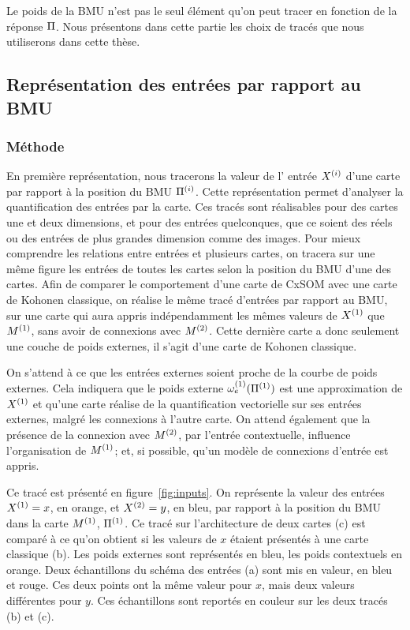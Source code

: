 Le poids de la BMU n'est pas le seul élément qu'on peut tracer en fonction de la réponse $\Pi$. Nous présentons dans cette partie les choix de tracés que nous utiliserons dans cette thèse.

\subsection{Représentation des entrées par rapport au BMU}

\subsubsection{Méthode}
En première représentation, nous tracerons la valeur de l' entrée $X^{({i})}$ d'une carte par rapport à la position du BMU $\Pi^{({i})}$. Cette représentation permet d'analyser la quantification des entrées par la carte. Ces tracés sont réalisables pour des cartes une et deux dimensions, et pour des entrées quelconques, que ce soient des réels ou des entrées de plus grandes dimension comme des images.
Pour mieux comprendre les relations entre entrées et plusieurs cartes, on tracera sur une même figure les entrées de toutes les cartes selon la position du BMU d'une des cartes. Afin de comparer le comportement d'une carte de CxSOM avec une carte de Kohonen classique, on réalise le même tracé d'entrées par rapport au BMU, sur une carte qui aura appris indépendamment les mêmes valeurs de $X^{({1})}$ que $M^{({1})}$, sans avoir de connexions avec $M^{({2})}$. Cette dernière carte a donc seulement une couche de poids externes, il s'agit d'une carte de Kohonen classique.

On s'attend à ce que les entrées externes soient proche de la courbe de poids externes. Cela indiquera que le poids externe $\omega_{e}^{({1})}(\Pi^{({1})})$ est une approximation de $X^{({1})}$ et qu'une carte réalise de la quantification vectorielle sur ses entrées externes, malgré les connexions à l'autre carte. On attend également que la présence de la connexion avec $M^{({2})}$, par l'entrée contextuelle, influence l'organisation de $M^{({1})}$; et, si possible, qu'un modèle de connexions d'entrée est appris.

Ce tracé est présenté en figure~\ref{fig:inputs}. On représente la valeur des entrées $X^{({1})} = x$, en orange, et $X^{({2})}=y$, en bleu, par rapport à la position du BMU dans la carte $M^{({1})}$, $\Pi^{({1})}$. Ce tracé sur l'architecture de deux cartes (c) est comparé à ce qu'on obtient si les valeurs de $x$ étaient présentés à une carte classique (b). Les poids externes sont représentés en bleu, les poids contextuels en orange. Deux échantillons du schéma des entrées (a) sont mis en valeur, en bleu et rouge. Ces deux points ont la même valeur pour $x$, mais deux valeurs différentes pour $y$. Ces échantillons sont reportés en couleur sur les deux tracés (b) et (c).
